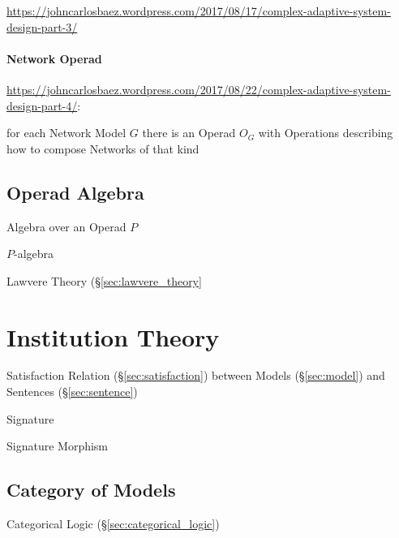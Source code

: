 \url{https://johncarlosbaez.wordpress.com/2017/08/17/complex-adaptive-system-design-part-3/}



\paragraph{Network Operad}\label{sec:network_operad}\hfill

\url{https://johncarlosbaez.wordpress.com/2017/08/22/complex-adaptive-system-design-part-4/}:

for each Network Model $G$ there is an Operad $O_G$ with Operations describing
how to compose Networks of that kind



\subsection{Operad Algebra}\label{sec:operad_algebra}

Algebra over an Operad $P$

$P$-algebra

Lawvere Theory (\S\ref{sec:lawvere_theory}



\section{Institution Theory}\label{sec:institution_theory}

Satisfaction Relation (\S\ref{sec:satisfaction}) between Models
(\S\ref{sec:model}) and Sentences (\S\ref{sec:sentence})

Signature

Signature Morphism



\subsection{Category of Models}\label{sec:category_of_models}

Categorical Logic (\S\ref{sec:categorical_logic})

